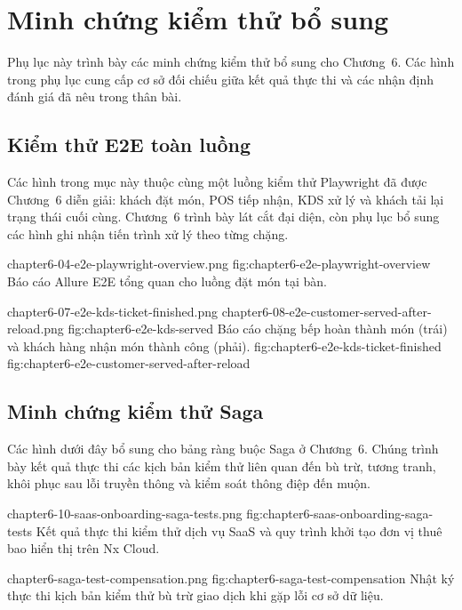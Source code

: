 \chapter{Minh chứng kiểm thử bổ sung}
\label{app:test-evidence}

Phụ lục này trình bày các minh chứng kiểm thử bổ sung cho Chương~6. Các hình trong phụ lục cung cấp cơ sở đối chiếu giữa kết quả thực thi và các nhận định đánh giá đã nêu trong thân bài.

\section{Kiểm thử E2E toàn luồng}

Các hình trong mục này thuộc cùng một luồng kiểm thử Playwright đã được Chương~6 diễn giải: khách đặt món, POS tiếp nhận, KDS xử lý và khách tải lại trạng thái cuối cùng. Chương~6 trình bày lát cắt đại diện, còn phụ lục bổ sung các hình ghi nhận tiến trình xử lý theo từng chặng.

  {chapter6-04-e2e-playwright-overview.png}
  {fig:chapter6-e2e-playwright-overview}
  {Báo cáo Allure E2E tổng quan cho luồng đặt món tại bàn.}

  {chapter6-07-e2e-kds-ticket-finished.png}
  {chapter6-08-e2e-customer-served-after-reload.png}
  {fig:chapter6-e2e-kds-served}
  {Báo cáo chặng bếp hoàn thành món (trái) và khách hàng nhận món thành công (phải).}
  {fig:chapter6-e2e-kds-ticket-finished}
  {fig:chapter6-e2e-customer-served-after-reload}

\section{Minh chứng kiểm thử Saga}

Các hình dưới đây bổ sung cho bảng ràng buộc Saga ở Chương~6. Chúng trình bày kết quả thực thi các kịch bản kiểm thử liên quan đến bù trừ, tương tranh, khôi phục sau lỗi truyền thông và kiểm soát thông điệp đến muộn.

  {chapter6-10-saas-onboarding-saga-tests.png}
  {fig:chapter6-saas-onboarding-saga-tests}
  {Kết quả thực thi kiểm thử dịch vụ SaaS và quy trình khởi tạo đơn vị thuê bao hiển thị trên Nx Cloud.}

  {chapter6-saga-test-compensation.png}
  {fig:chapter6-saga-test-compensation}
  {Nhật ký thực thi kịch bản kiểm thử bù trừ giao dịch khi gặp lỗi cơ sở dữ liệu.}

